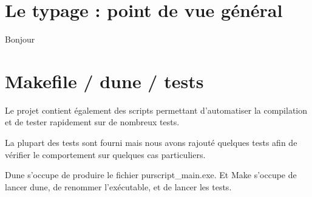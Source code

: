 \documentclass[12pt,a4paper,french]{article}
\begin{document}
\part*{Le typage : point de vue général}

Bonjour



\part*{Makefile / dune / tests}
Le projet contient également des scripts permettant d'automatiser la compilation et de tester rapidement sur de nombreux tests.

La plupart des tests sont fourni mais nous avons rajouté quelques tests afin de vérifier le comportement sur quelques cas particuliers.

Dune s'occupe de produire le fichier purscript\_main.exe. Et Make s'occupe de lancer dune, de renommer l'exécutable, et de lancer les tests.
\end{document}
